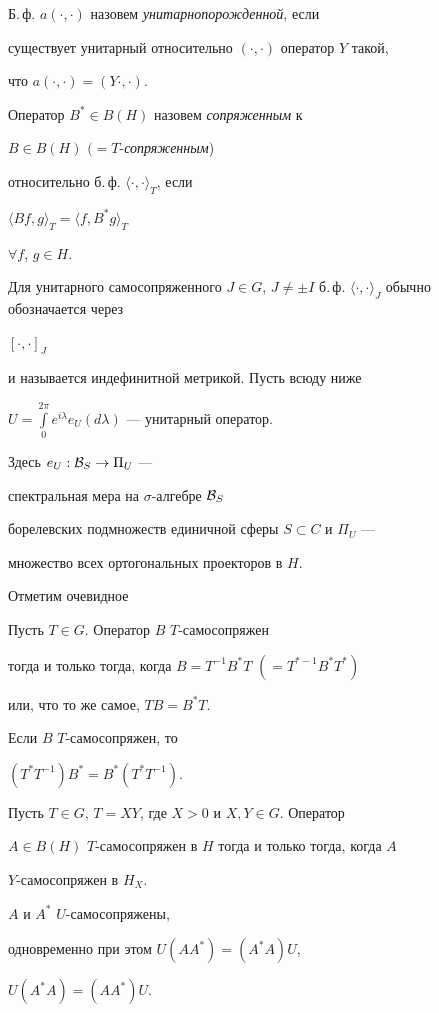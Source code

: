 Б.\,ф. $a(\cdot,\cdot)$ назовем {\it унитарнопорожденной}, если


существует унитарный относительно $(\cdot, \cdot)$ оператор $Y$ такой,


что $a(\cdot,\cdot)=(Y\cdot,\cdot)$.


Оператор $B^{*}\in B(H)$ назовем {\it сопряженным} к


$B\in B(H)$ $(=T$-{\it сопряженным})


относительно б.\,ф. $\langle\cdot,\cdot \rangle_{T}$, если


$\langle Bf,g\rangle_{T}=\langle f,B^{*}g\rangle_{T}$


$\forall f$, $g\in H$.


Для унитарного самосопряженного $J\in G$, $J\ne


\pm I$ б.\,ф. $\langle\cdot,\cdot \rangle_{J}$ обычно обозначается через


$[\cdot,\cdot ]_{J}$


и называется индефинитной метрикой. Пусть всюду ниже


$U=\int\limits_{0}^{2\pi}e^{i\lambda}e_{U}(d\lambda)$ --- унитарный оператор.


Здесь $e_{U}: {\cal B}_{S}\rightarrow \Pi_{U}$ ---


спектральная мера на $\sigma$-алгебре ${\cal B}_{S}$


борелевских подмножеств единичной сферы $S\subset C$ и $\Pi_{U}$ ---


множество всех ортогональных проекторов в $H$.





Отметим очевидное





\begin{prop}


Пусть $T\in G$. Оператор $B$\; $T$-самосопряжен


тогда и только тогда, когда $B=T^{-1}B^{*}T$ $(= T^{*-1}B^{*}T^{*})$


или, что то же самое, $TB=B^{*}T$.





Если $B$\; $T$-самосопряжен, то


$(T^{*}T^{-1})B^{*}=B^{*}(T^{*}T^{-1})$.





Пусть $T\in G$, $T=XY$, где $X>0$ и $X, Y\in G$. Оператор


$A\in B(H)$\; $T$-самосопряжен в $H$ тогда и только тогда, когда $A$\;


$Y$-самосопряжен в $H_{X}$.





$A$ и $A^{*}$\; $U$-самосопряжены,


одновременно при этом $U(AA^{*})=(A^{*}A)U$,


$U(A^{*}A)=(AA^{*})U$.


\end{prop}






